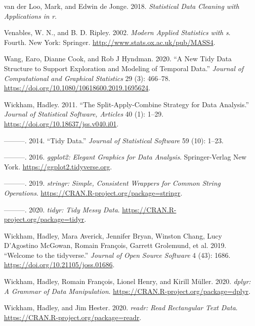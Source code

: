\documentclass{article}
\newlength{\cslhangindent}
\newlength{\cslentryspacingunit} %
\newenvironment{CSLReferences}[2] %
 {%
  \setlength{\parindent}{0pt}
  \ifodd #1
  \let\oldpar\par
  \def\par{\hangindent=\cslhangindent\oldpar}
  \fi
  \setlength{\parskip}{#2\cslentryspacingunit}
 }%
 {}
\begin{document}
\begin{CSLReferences}{1}{0}
\leavevmode{}%
van der Loo, Mark, and Edwin de Jonge. 2018. \emph{Statistical Data Cleaning with Applications in r}.

\leavevmode{}%
Venables, W. N., and B. D. Ripley. 2002. \emph{Modern Applied Statistics with s}. Fourth. New York: Springer. \url{http://www.stats.ox.ac.uk/pub/MASS4}.

\leavevmode{}%
Wang, Earo, Dianne Cook, and Rob J Hyndman. 2020. {``A New Tidy Data Structure to Support Exploration and Modeling of Temporal Data.''} \emph{Journal of Computational and Graphical Statistics} 29 (3): 466--78. \url{https://doi.org/10.1080/10618600.2019.1695624}.

\leavevmode{}%
Wickham, Hadley. 2011. {``The Split-Apply-Combine Strategy for Data Analysis.''} \emph{Journal of Statistical Software, Articles} 40 (1): 1--29. \url{https://doi.org/10.18637/jss.v040.i01}.

\leavevmode{}%
---------. 2014. {``Tidy Data.''} \emph{Journal of Statistical Software} 59 (10): 1--23.

\leavevmode{}%
---------. 2016. \emph{{ggplot2: Elegant Graphics for Data Analysis}}. Springer-Verlag New York. \url{https://ggplot2.tidyverse.org}.

\leavevmode{}%
---------. 2019. \emph{{stringr: Simple, Consistent Wrappers for Common String Operations}}. \url{https://CRAN.R-project.org/package=stringr}.

\leavevmode{}%
---------. 2020. \emph{{tidyr: Tidy Messy Data}}. \url{https://CRAN.R-project.org/package=tidyr}.

\leavevmode{}%
Wickham, Hadley, Mara Averick, Jennifer Bryan, Winston Chang, Lucy D'Agostino McGowan, Romain François, Garrett Grolemund, et al. 2019. {``Welcome to the {tidyverse}.''} \emph{Journal of Open Source Software} 4 (43): 1686. \url{https://doi.org/10.21105/joss.01686}.

\leavevmode{}%
Wickham, Hadley, Romain François, Lionel Henry, and Kirill Müller. 2020. \emph{{dplyr: A Grammar of Data Manipulation}}. \url{https://CRAN.R-project.org/package=dplyr}.

\leavevmode{}%
Wickham, Hadley, and Jim Hester. 2020. \emph{{readr: Read Rectangular Text Data}}. \url{https://CRAN.R-project.org/package=readr}.


\end{CSLReferences}
\end{document}
